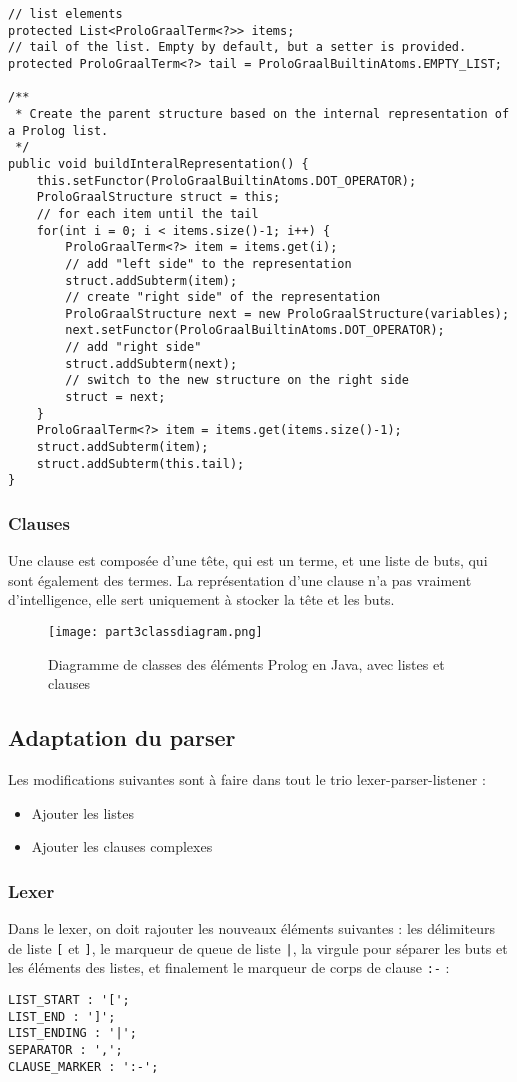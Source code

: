 \documentclass[../report.tex]{subfiles}
\begin{document}
\begin{verbatim}
// list elements
protected List<ProloGraalTerm<?>> items;
// tail of the list. Empty by default, but a setter is provided.
protected ProloGraalTerm<?> tail = ProloGraalBuiltinAtoms.EMPTY_LIST;

/**
 * Create the parent structure based on the internal representation of a Prolog list. 
 */
public void buildInteralRepresentation() {
    this.setFunctor(ProloGraalBuiltinAtoms.DOT_OPERATOR);
    ProloGraalStructure struct = this;
    // for each item until the tail
    for(int i = 0; i < items.size()-1; i++) {
        ProloGraalTerm<?> item = items.get(i);
        // add "left side" to the representation
        struct.addSubterm(item);
        // create "right side" of the representation
        ProloGraalStructure next = new ProloGraalStructure(variables);
        next.setFunctor(ProloGraalBuiltinAtoms.DOT_OPERATOR);
        // add "right side"
        struct.addSubterm(next);
        // switch to the new structure on the right side
        struct = next;
    }
    ProloGraalTerm<?> item = items.get(items.size()-1);
    struct.addSubterm(item);
    struct.addSubterm(this.tail);
}
\end{verbatim}
\subsubsection{Clauses}
Une clause est composée d'une tête, qui est un terme, et une liste de buts, qui sont également des termes. La représentation d'une clause n'a pas vraiment d'intelligence, elle sert uniquement à stocker la tête et les buts.
\begin{figure}[h]
    \centering
    \texttt{[image: part3classdiagram.png]}
    \caption{Diagramme de classes des éléments Prolog en Java, avec listes et clauses}
    \label{fig:part3classdiagram}
\end{figure}
\subsection{Adaptation du parser}
Les modifications suivantes sont à faire dans tout le trio lexer-parser-listener :
\begin{itemize}
    \item Ajouter les listes
    \item Ajouter les clauses complexes
\end{itemize}
\subsubsection{Lexer}
Dans le lexer, on doit rajouter les nouveaux éléments suivantes : les délimiteurs de liste \texttt{[} et \texttt{]}, le marqueur de queue de liste \texttt{|}, la virgule pour séparer les buts et les éléments des listes, et finalement le marqueur de corps de clause \texttt{:-} :
\begin{verbatim}
LIST_START : '[';
LIST_END : ']';
LIST_ENDING : '|';    
SEPARATOR : ',';
CLAUSE_MARKER : ':-';
\end{verbatim}
\end{document}
